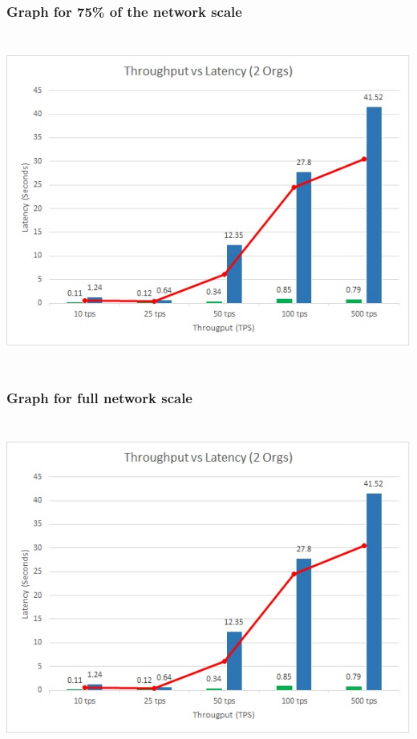 \documentclass{ceadar_article}
\begin{document}
\subsubsection{Graph for 75\% of the network scale}
    \includegraphics[width=17cm,height=11cm]{ChartSample}

\subsubsection{Graph for full network scale}
    \includegraphics[width=17cm,height=11cm]{ChartSample}
\end{document}
